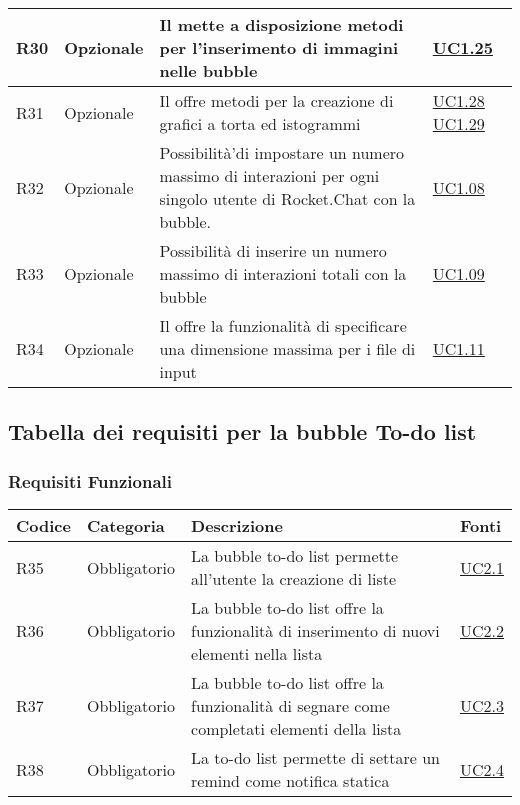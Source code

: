 \begin{longtable}{|P{1.5cm}|P{3cm}|P{6cm}|P{2.5cm}|}
	\hline R30 & Opzionale & Il  mette a disposizione metodi per l’inserimento di immagini nelle bubble
	 & \hyperref[UC1.25]{UC1.25} \\
	\hline R31 & Opzionale & Il  offre metodi per la creazione di grafici a torta ed istogrammi
	 & \hyperref[UC1.28]{UC1.28} \linebreak \hyperref[UC1.29]{UC1.29}  \\	 
	 \hline R32 & Opzionale & Possibilità'di impostare un numero massimo di interazioni per ogni singolo utente di Rocket.Chat con la bubble. & \hyperref[UC1.08]{UC1.08} \\
	 \hline R33 & Opzionale & Possibilità di inserire un numero massimo di interazioni totali con la bubble & \hyperref[UC1.09]{UC1.09} \\
	 \hline R34 & Opzionale & Il  offre la funzionalità di specificare una dimensione massima per i file di input & \hyperref[UC1.11]{UC1.11} \\
	\hline
\end{longtable}


\subsection{Tabella dei requisiti per la bubble To-do list}

\subsubsection{Requisiti Funzionali}

\begin{longtable}{|P{1.5cm}|P{3cm}|P{6cm}|P{2.5cm}|}
	\hline \textbf{Codice} & \textbf{Categoria} & \textbf{Descrizione} & \textbf{Fonti} \\
	\hline R35 & Obbligatorio & La bubble to-do list permette all’utente la creazione di liste & \hyperref[UC2.1]{UC2.1} \\
	\hline R36 & Obbligatorio & La bubble to-do list offre la funzionalità di inserimento di nuovi elementi nella lista & \hyperref[UC2.2]{UC2.2} \\
	\hline R37 & Obbligatorio & La bubble to-do list offre la funzionalità di segnare come completati elementi della lista & \hyperref[UC2.3]{UC2.3} \\
	\hline R38 & Obbligatorio & La to-do list permette di settare un  remind come notifica statica & \hyperref[UC2.4]{UC2.4} \\
	\hline
\end{longtable}

